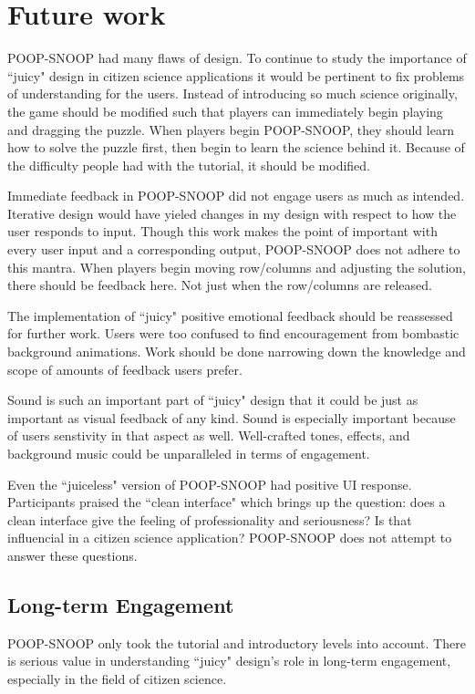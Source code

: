 \chapter{Future work}

POOP-SNOOP had many flaws of design. To continue to study the importance of ``juicy" design in citizen science applications it would be pertinent to fix problems of understanding for the users. Instead of introducing so much science originally, the game should be modified such that players can immediately begin playing and dragging the puzzle. When players begin POOP-SNOOP, they should learn how to solve the puzzle first, then begin to learn the science behind it. Because of the difficulty people had with the tutorial, it should be modified.

Immediate feedback in POOP-SNOOP did not engage users as much as intended. Iterative design would have yieled changes in my design with respect to how the user responds to input. Though this work makes the point of important with every user input and a corresponding output, POOP-SNOOP does not adhere to this mantra. When players begin moving row/columns and adjusting the solution, there should be feedback here. Not just when the row/columns are released.

The implementation of ``juicy" positive emotional feedback should be reassessed for further work. Users were too confused to find encouragement from bombastic background animations. Work should be done narrowing down the knowledge and scope of amounts of feedback users prefer.

Sound is such an important part of ``juicy" design that it could be just as important as visual feedback of any kind. Sound is especially important because of users senstivity in that aspect as well. Well-crafted tones, effects, and background music could be unparalleled in terms of engagement. 

Even the ``juiceless" version of POOP-SNOOP had positive UI response. Participants praised the ``clean interface" which brings up the question: does a clean interface give the feeling of professionality and seriousness? Is that influencial in a citizen science application? POOP-SNOOP does not attempt to answer these questions.

\section{Long-term Engagement}

POOP-SNOOP only took the tutorial and introductory levels into account. There is serious value in understanding ``juicy" design's role in long-term engagement, especially in the field of citizen science. 
